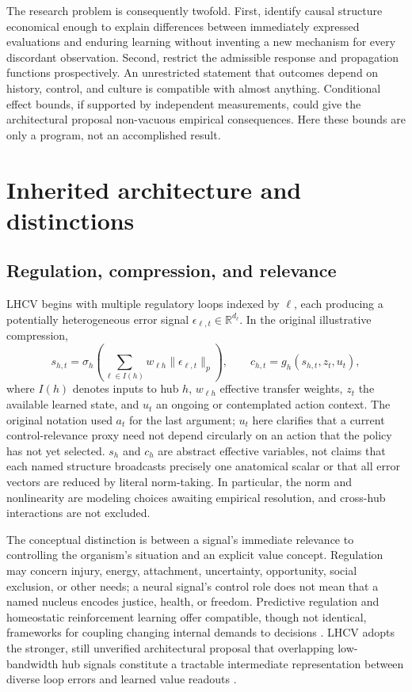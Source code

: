 \documentclass[11pt,a4paper]{article}
\begin{document}
The research problem is consequently twofold. First, identify causal structure economical enough to explain differences between immediately expressed evaluations and enduring learning without inventing a new mechanism for every discordant observation. Second, restrict the admissible response and propagation functions prospectively. An unrestricted statement that outcomes depend on history, control, and culture is compatible with almost anything. Conditional effect bounds, if supported by independent measurements, could give the architectural proposal non-vacuous empirical consequences. Here these bounds are only a program, not an accomplished result.

\section{Inherited architecture and distinctions}
\subsection{Regulation, compression, and relevance}
LHCV begins with multiple regulatory loops indexed by $\ell$, each producing a potentially heterogeneous error signal $\epsilon_{\ell,t}\in\mathbb R^{d_\ell}$. In the original illustrative compression,
\begin{equation}
 s_{h,t}=\sigma_h\!\left(\sum_{\ell\in I(h)}w_{\ell h}\lVert\epsilon_{\ell,t}\rVert_p\right),\qquad
 c_{h,t}=g_h(s_{h,t},z_t,u_t),
 \label{eq:lhcv}
\end{equation}
where $I(h)$ denotes inputs to hub $h$, $w_{\ell h}$ effective transfer weights, $z_t$ the available learned state, and $u_t$ an ongoing or contemplated action context. The original notation used $a_t$ for the last argument; $u_t$ here clarifies that a current control-relevance proxy need not depend circularly on an action that the policy has not yet selected. $s_h$ and $c_h$ are abstract effective variables, not claims that each named structure broadcasts precisely one anatomical scalar or that all error vectors are reduced by literal norm-taking. In particular, the norm and nonlinearity are modeling choices awaiting empirical resolution, and cross-hub interactions are not excluded.

The conceptual distinction is between a signal's immediate relevance to controlling the organism's situation and an explicit value concept. Regulation may concern injury, energy, attachment, uncertainty, opportunity, social exclusion, or other needs; a neural signal's control role does not mean that a named nucleus encodes justice, health, or freedom. Predictive regulation and homeostatic reinforcement learning offer compatible, though not identical, frameworks for coupling changing internal demands to decisions \citep{sterling2012,keramati2014}. LHCV adopts the stronger, still unverified architectural proposal that overlapping low-bandwidth hub signals constitute a tractable intermediate representation between diverse loop errors and learned value readouts \citep{zarnckeLHCV}.
\end{document}
